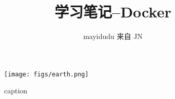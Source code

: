 \documentclass{ctexart}
\newcommand{\jn}{JN}
\begin{document}
\title{学习笔记--Docker}
\author{mayidudu 来自 \jn}
\maketitle

\begin{figure}[htbp]
\centering
\texttt{[image: figs/earth.png]}
\caption{caption}
\label{fig:label}
\end{figure}
\end{document}
